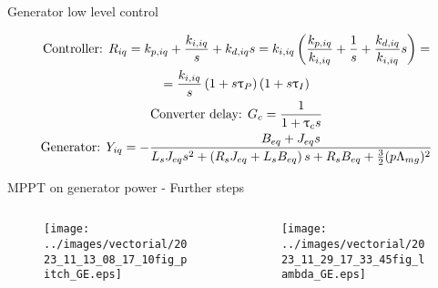 \begin{frame}{Generator low level control}
  \begin{figure}[H]
    \centering
    \begingroup
      
    \endgroup
  \end{figure}

  \begin{gather}
    \text{Controller: } R_{iq}=k_{p,iq} + \frac{k_{i,iq}}{s}+k_{d,iq}s=k_{i,iq}\left( \frac{k_{p,iq}}{k_{i,iq}} + \frac{1}{s} + \frac{k_{d,iq}}{k_{i,iq}}s \right) = \notag\\
    =\frac{k_{i,iq}}{s}\left(1+s\uptau_P\right)\left(1+s\uptau_I\right) \notag\\
    \text{Converter delay: } G_c = \frac{1}{1+\uptau_cs} \notag\\
    \text{Generator: } Y_{iq} = -\frac{B_{eq} + J_{eq}s}{L_sJ_{eq}s^2+\left(R_sJ_{eq} + L_s B_{eq}\right)s + R_sB_{eq} + \frac{3}{2}(p\Lambda_{mg})^2} \notag        
  \end{gather}
\end{frame}

\begin{frame}{MPPT on generator power - Further steps}
  \begin{columns}
    \begin{column}{0.5\columnwidth}
      \begin{figure}[!htbp]
        \centering
        \texttt{[image: ../images/vectorial/2023\_11\_13\_08\_17\_10fig\_pitch\_GE.eps]}
      \end{figure}
    \end{column}
    \begin{column}{0.5\columnwidth}
      \begin{figure}[!htbp]
        \centering
        \texttt{[image: ../images/vectorial/2023\_11\_29\_17\_33\_45fig\_lambda\_GE.eps]}
      \end{figure}
    \end{column}
  \end{columns}
\end{frame}

